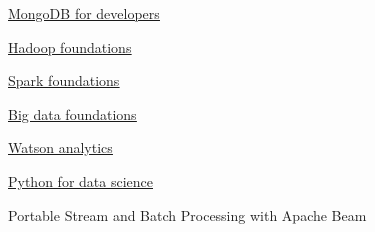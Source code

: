 %
%
%


\begin{coursework}


        {\href{https://university.mongodb.com/course_completion/30f19185172f43e58ae4a0cd9ce13ff0}
        {\underline{MongoDB for developers}}}

        {\href{https://www.youracclaim.com/badges/714d2307-3169-496f-a521-17aeb790f099/public_url}
        {\underline{Hadoop foundations}}}

        {\href{https://www.youracclaim.com/badges/c11a6bc7-ee82-42e6-b9d3-b21c08d68d60/public_url}
        {\underline{Spark foundations}}}

        {\href{https://www.youracclaim.com/badges/fb7b0207-6a42-49fc-bf3e-48d139e150c6/public_url}
        {\underline{Big data foundations}}}

        {\href{https://www.youracclaim.com/badges/89aa54fb-143a-4053-9a97-a7b1461e1f60/public_url}
        {\underline{Watson analytics}}}


        {\href{https://courses.edx.org/certificates/0626a02340944e6b9b1854be5e171da0}
        {\underline{Python for data science}}}

        {Portable Stream and Batch Processing with Apache Beam}




\end{coursework}
